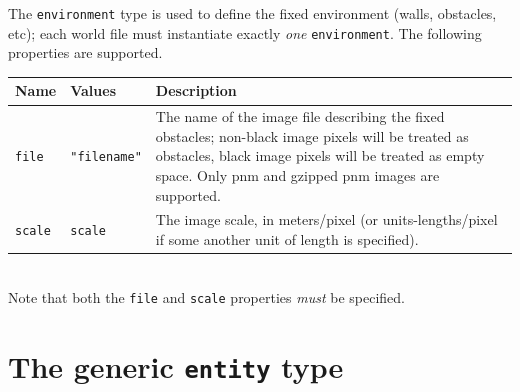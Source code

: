 \documentclass[11pt]{report}
\begin{document}
The \verb'environment' type is used to define the fixed environment
(walls, obstacles, etc); each world file must instantiate exactly {\em
one} \verb'environment'.  The following properties are supported.
\vspace{1em}\\\noindent
\begin{tabularx}{\columnwidth}{llX}
\hline
Name & Values & Description \\
\hline

\verb'file' & \verb'"filename"' & The name of the image file
describing the fixed obstacles; non-black image pixels will be treated
as obstacles, black image pixels will be treated as empty space.  Only
pnm and gzipped pnm images are supported.\\

\verb'scale' & \verb'scale' & The image scale, in meters/pixel (or
units-lengths/pixel if some another unit of length is specified).\\

\hline
\end{tabularx}
\vspace{1em}\\
\noindent Note that both the \verb'file' and \verb'scale'
properties {\em must} be specified.


\newpage
\section{The generic {\tt entity} type}
\end{document}
